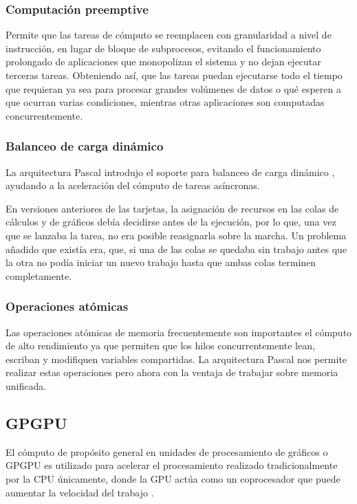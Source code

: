     \subsubsection{Computación preemptive}
    Permite que las tareas de cómputo se reemplacen con granularidad a nivel de instrucción, en lugar de bloque de subprocesos, evitando el funcionamiento prolongado de aplicaciones que monopolizan el sistema y no dejan ejecutar terceras tareas\cite{WPNV}. Obteniendo así, que las tareas puedan ejecutarse todo el tiempo que requieran ya sea para procesar grandes volúmenes de datos o qué esperen a que ocurran varias condiciones, mientras otras aplicaciones son computadas concurrentemente.

    \subsubsection{Balanceo de carga dinámico}
        La arquitectura Pascal introdujo el soporte para balanceo de carga dinámico \cite{AnPasc},  ayudando a la aceleración del cómputo de tareas asíncronas.
        
        \vspace{0.3cm}
    En versiones anteriores de las tarjetas, la asignación de recursos en las colas de cálculos y de gráficos debía decidirse antes de la ejecución, por lo que, una vez que se lanzaba la tarea, no era posible reasignarla sobre la marcha. Un problema añadido que existía era, que, si una de las colas se quedaba sin trabajo antes que la otra no podía iniciar un nuevo trabajo hasta que ambas colas terminen completamente\cite{PasAna}.
    
    \subsubsection{Operaciones atómicas} 
    Las operaciones atómicas de memoria frecuentemente son importantes el cómputo de alto rendimiento ya que permiten que los hilos concurrentemente lean, escriban y modifiquen variables compartidas. La arquitectura Pascal nos permite realizar estas operaciones pero ahora con la ventaja de trabajar sobre memoria unificada.

    \subsection{GPGPU}
    El cómputo de propósito general en unidades de procesamiento de gráficos o GPGPU es utilizado para acelerar el procesamiento realizado tradicionalmente por la CPU únicamente, donde la GPU actúa como un coprocesador que puede aumentar la velocidad del trabajo \cite{GpuCpu}.

